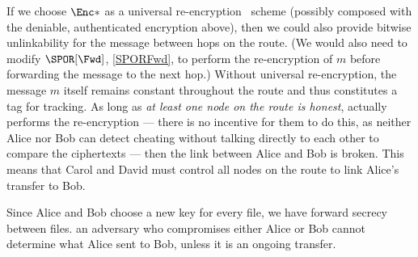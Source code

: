 If we choose \(\Enc*\) as a universal re-encryption~\cite{UniversalReencryption} 
scheme (possibly composed with the deniable, authenticated encryption above), 
then we could also provide bitwise unlinkability for the message between hops on 
the route.
(We would also need to modify \(\SPOR[\Fwd]\), \cref{SPORFwd}, to perform the 
re-encryption of \(m\) before forwarding the message to the next hop.)
Without universal re-encryption, the message \(m\) itself remains constant 
throughout the route and thus constitutes a tag for tracking.
As long as \emph{at least one node on the route is honest}, \ie actually 
performs the re-encryption --- there is no incentive for them to do this, as 
neither Alice nor Bob can detect cheating without talking directly to each other 
to compare the ciphertexts --- then the link between Alice and Bob is broken.
This means that Carol and David must control all nodes on the route to link 
Alice's transfer to Bob.

Since Alice and Bob choose a new key for every file, we have forward secrecy 
between files.
\Eg an adversary who compromises either Alice or Bob cannot determine what Alice 
sent to Bob, unless it is an ongoing transfer.

